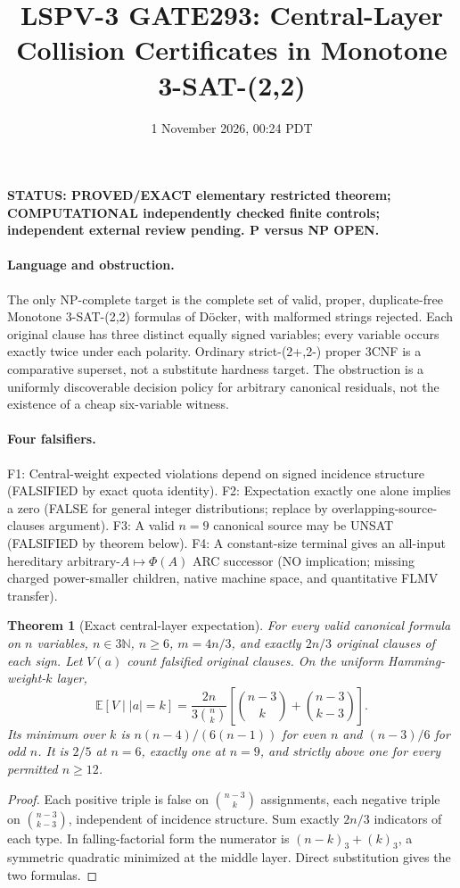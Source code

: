 \documentclass[11pt]{article}
\title{LSPV-3 GATE293: Central-Layer Collision Certificates in Monotone 3-SAT-(2,2)}
\date{1 November 2026, 00:24 PDT}
\newtheorem{theorem}{Theorem}
\begin{document}
\maketitle
\noindent\textbf{STATUS: PROVED/EXACT elementary restricted theorem; COMPUTATIONAL independently checked finite controls; independent external review pending. P versus NP OPEN.}

\paragraph{Language and obstruction.}
The only NP-complete target is the complete set of valid, proper, duplicate-free Monotone 3-SAT-(2,2) formulas of D\"ocker, with malformed strings rejected. Each original clause has three distinct equally signed variables; every variable occurs exactly twice under each polarity. Ordinary strict-(2+,2-) proper 3CNF is a comparative superset, not a substitute hardness target. The obstruction is a uniformly discoverable decision policy for arbitrary canonical residuals, not the existence of a cheap six-variable witness.

\paragraph{Four falsifiers.}
F1: Central-weight expected violations depend on signed incidence structure (FALSIFIED by exact quota identity). F2: Expectation exactly one alone implies a zero (FALSE for general integer distributions; replace by overlapping-source-clauses argument). F3: A valid $n=9$ canonical source may be UNSAT (FALSIFIED by theorem below). F4: A constant-size terminal gives an all-input hereditary arbitrary-$A\mapsto\Phi(A)$ ARC successor (NO implication; missing charged power-smaller children, native machine space, and quantitative FLMV transfer).

\begin{theorem}[Exact central-layer expectation]
For every valid canonical formula on $n$ variables, $n\in3\mathbb N$, $n\ge6$, $m=4n/3$, and exactly $2n/3$ original clauses of each sign. Let $V(a)$ count falsified original clauses. On the uniform Hamming-weight-$k$ layer,
\[
\mathbb E[V\mid |a|=k]
=\frac{2n}{3\binom nk}
\left[\binom{n-3}{k}+\binom{n-3}{k-3}\right].
\]
Its minimum over $k$ is $n(n-4)/(6(n-1))$ for even $n$ and $(n-3)/6$ for odd $n$. It is $2/5$ at $n=6$, exactly one at $n=9$, and strictly above one for every permitted $n\ge12$.
\end{theorem}
\begin{proof}
Each positive triple is false on $\binom{n-3}k$ assignments, each negative triple on $\binom{n-3}{k-3}$, independent of incidence structure. Sum exactly $2n/3$ indicators of each type. In falling-factorial form the numerator is $(n-k)_3+(k)_3$, a symmetric quadratic minimized at the middle layer. Direct substitution gives the two formulas.
\end{proof}
\end{document}
